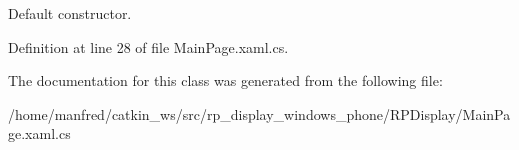 \-Default constructor. 



\-Definition at line 28 of file \-Main\-Page.\-xaml.\-cs.



\-The documentation for this class was generated from the following file\-:\begin{DoxyCompactItemize}
\item 
/home/manfred/catkin\-\_\-ws/src/rp\-\_\-display\-\_\-windows\-\_\-phone/\-R\-P\-Display/\-Main\-Page.\-xaml.\-cs\end{DoxyCompactItemize}
